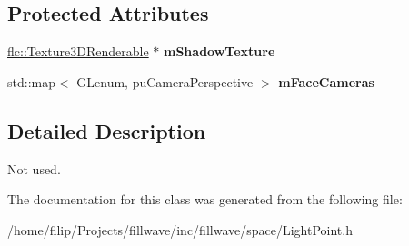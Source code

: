 \subsection*{Protected Attributes}
\begin{DoxyCompactItemize}
\item 
\hyperlink{classflw_1_1flc_1_1Texture3DRenderable}{flc\+::\+Texture3\+D\+Renderable} $\ast$ {\bfseries m\+Shadow\+Texture}\hypertarget{classflw_1_1flf_1_1LightPoint_aad378f3ce76565ce6bbcb0f06722152d}{}\label{classflw_1_1flf_1_1LightPoint_aad378f3ce76565ce6bbcb0f06722152d}

\item 
std\+::map$<$ G\+Lenum, pu\+Camera\+Perspective $>$ {\bfseries m\+Face\+Cameras}\hypertarget{classflw_1_1flf_1_1LightPoint_a0397b288ef6882c6a57cd07dbba58d1e}{}\label{classflw_1_1flf_1_1LightPoint_a0397b288ef6882c6a57cd07dbba58d1e}

\end{DoxyCompactItemize}


\subsection{Detailed Description}
Not used. 

The documentation for this class was generated from the following file\+:\begin{DoxyCompactItemize}
\item 
/home/filip/\+Projects/fillwave/inc/fillwave/space/Light\+Point.\+h\end{DoxyCompactItemize}
